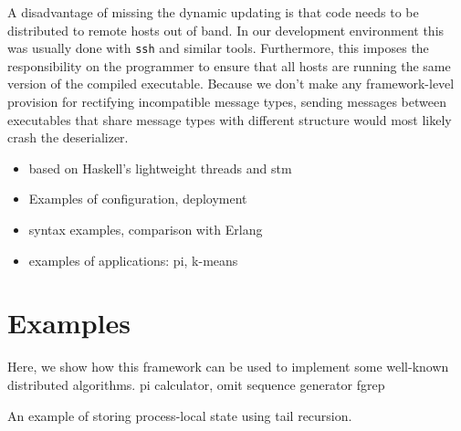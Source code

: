 \documentclass[preprint]{sigplanconf}
\begin{document}
A disadvantage of missing the dynamic updating is that code needs to be distributed to remote hosts out of band. In our development environment this was usually done with \texttt{ssh} and similar tools. Furthermore, this imposes the responsibility on the programmer to ensure that all hosts are running the same version of the compiled executable. Because we don't make any framework-level provision for rectifying incompatible message types, sending messages between executables that share message types with different structure would most likely crash the deserializer.

\begin{itemize}
\item based on Haskell's lightweight threads  and stm
\item Examples of configuration, deployment
\item syntax examples, comparison with Erlang
\item examples of applications: pi, k-means
\end{itemize}


\section{Examples}
Here, we show how this framework can be used to implement some well-known distributed algorithms.
pi calculator, omit sequence generator
fgrep


An example of storing process-local state using tail recursion.
\end{document}
